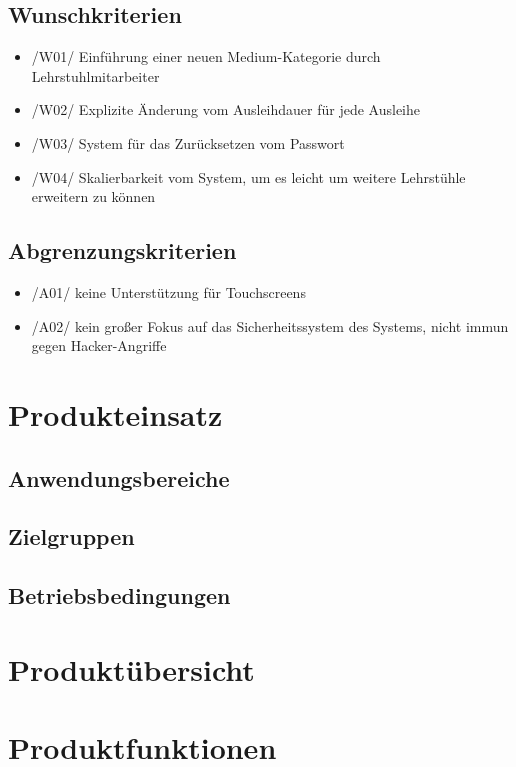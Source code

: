 \documentclass[12pt, a4paper]{article}
\begin{document}
\subsection{Wunschkriterien}
\begin{itemize}
	\item /W01/ Einführung einer neuen Medium-Kategorie durch Lehrstuhlmitarbeiter
	\item /W02/ Explizite Änderung vom Ausleihdauer für jede Ausleihe 
	\item /W03/ System für das Zurücksetzen vom Passwort
	\item /W04/ Skalierbarkeit vom System, um es leicht um weitere Lehrstühle erweitern zu können
\end{itemize}
\subsection{Abgrenzungskriterien}
\begin{itemize}
	\item /A01/ keine Unterstützung für Touchscreens
	\item /A02/ kein großer Fokus auf das Sicherheitssystem des Systems, nicht immun gegen Hacker-Angriffe 
\end{itemize}
\pagebreak

\section{Produkteinsatz}
\subsection{Anwendungsbereiche}
\subsection{Zielgruppen}
\subsection{Betriebsbedingungen}
\pagebreak

\section{Produktübersicht}
\pagebreak

\section{Produktfunktionen}
\end{document}
